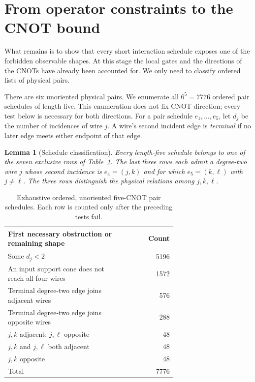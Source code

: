 \documentclass[11pt]{article}
\newtheorem{lemma}{Lemma}
\begin{document}
\section{From operator constraints to the CNOT bound}

What remains is to show that every short interaction schedule exposes
one of the forbidden observable shapes. At this stage the local gates
and the directions of the CNOTs have already been accounted for. We
only need to classify ordered lists of physical pairs.

There are six unoriented physical pairs.  We enumerate all $6^5=7776$
ordered pair schedules of length five.  This enumeration does not fix
CNOT direction; every test below is necessary for both directions.
For a pair schedule $e_1,\ldots,e_5$, let $d_j$ be the number of
incidences of wire $j$.  A wire's second incident edge is
\emph{terminal} if no later edge meets either endpoint of that edge.

\begin{lemma}[Schedule classification]\label{lem:enumeration}
Every length-five schedule belongs to one of the seven exclusive rows of
Table~\ref{tab:schedules}.  The last three rows each admit a degree-two
wire $j$ whose second incidence is $e_4=(j,k)$ and for which
$e_5=(k,\ell)$ with $j\ne\ell$.  The three rows distinguish the
physical relations among $j,k,\ell$.
\end{lemma}

\begin{table}[ht]
\centering
\caption{Exhaustive ordered, unoriented five-CNOT pair schedules.  Each
row is counted only after the preceding tests fail.}
\label{tab:schedules}
\begin{tabular}{p{0.68\linewidth}r}
\toprule
First necessary obstruction or remaining shape & Count\\
\midrule
Some $d_j<2$ & 5196\\
An input support cone does not reach all four wires & 1572\\
Terminal degree-two edge joins adjacent wires & 576\\
Terminal degree-two edge joins opposite wires & 288\\
$j,k$ adjacent; $j,\ell$ opposite & 48\\
$j,k$ and $j,\ell$ both adjacent & 48\\
$j,k$ opposite & 48\\
\midrule
Total & 7776\\
\bottomrule
\end{tabular}
\end{table}
\end{document}
